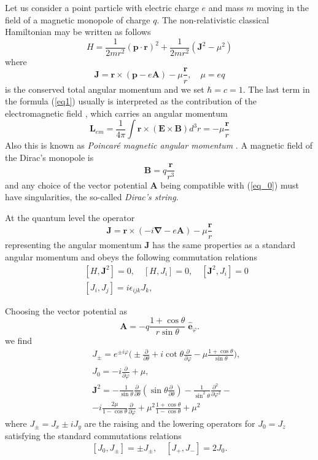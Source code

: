 \documentclass[a4paper,twocolumn,aps,showpacs,showkeys]{revtex4}
\begin{document}
Let us consider a point particle with electric charge $e$
and mass $m$ moving in the field of a magnetic monopole of charge $q$.
The non-relativistic classical Hamiltonian  may be written as follows
\cite{Gol}
\[
H = \frac{1}{2m r^2}({\mathbf p}\cdot{\mathbf r})^2 +
\frac{1}{2mr^2}({\mathbf J}^2 - \mu^2)
\]
where
\begin{equation}
{\mathbf J} = {\mathbf r}\times({\mathbf p} - e{\mathbf A}) -
\mu\frac{\mathbf r}{r}, \quad \mu = eq
\label{eq1}
\end{equation}
is the conserved total angular momentum and we set $\hbar = c =1$.
The last term in the formula (\ref{eq1}) usually is interpreted as the
contribution of the electromagnetic field \cite{Gol,Wil,Gol2,Lyn}, which
carries an angular momentum
\[
{\mathbf L}_{em}=\frac{1}{4\pi}\int {\mathbf r} \times({\mathbf
E}\times{\mathbf B}) d^3 r = - \mu\frac{\mathbf r}{r}
\]
Also this is known as {\it Poincar\'e magnetic angular momentum}
\cite{Ber}. A magnetic field of the Dirac's monopole is
\begin{equation}
{\mathbf B} = q \frac{\mathbf r}{r^3}
\label{eq_0}
\end{equation}
and any choice of the vector potential $\mathbf A$ being compatible with
(\ref{eq_0}) must have singularities, the so-called {\it Dirac's string}.

At the quantum level the operator
\begin{equation}
{\mathbf J} = {\mathbf r} \times \left({-i\mathbf \nabla} - e{\mathbf
A}\right) - \mu\frac{\mathbf r}{r}
\end{equation}
representing the angular momentum $\mathbf J$ has the same
properties as a standard angular momentum and obeys the following
commutation relations
\begin{eqnarray}
&&[H, {\mathbf J}^2] = 0, \quad [H, J_i] = 0,\quad  [{\mathbf J}^2, J_i] =
0 \label{eq5a} \\
&&[J_i, J_j] = i\epsilon_{ijk}J_k,
\end{eqnarray}

Choosing the vector potential as
\[
{\mathbf A} = -q\frac{1 + \cos\theta}{r\sin\theta}\;{\hat{\mathbf
e}}_{\varphi}.
\]
we find
\begin{eqnarray}
&&J_{\pm}= e^{\pm i\varphi}\bigg(\pm\frac{\partial}{\partial\theta}
+i\cot\theta \frac{\partial}{\partial\varphi} -
\mu\frac{1+\cos\theta}{\sin\theta} \bigg),\\
&&J_0=-i\frac{\partial}{\partial\varphi} + \mu,\\
&&{\mathbf J^2} =-\frac{1}{\sin{\theta}}
\frac{\partial~}{\partial\theta}\left(\sin{\theta}
\frac{\partial~}{\partial\theta}\right) -
\frac{1}{\sin^2{\theta}}\frac{\partial^2~}{\partial\varphi^2} - \nonumber\\
&&-i\frac{2\mu}{1 -\cos{\theta}}\frac{\partial~}{\partial\varphi}
+\mu^2\frac{1 + \cos{\theta}}{1 - \cos{\theta}} +\mu^2
\end{eqnarray}
where  $J_{\pm} = J_x \pm iJ_y$ are the raising and the lowering
operators for $J_0 = J_z$ satisfying the standard commutations
relations
\[
[J_0,J_{\pm}] = \pm J_{\pm}, \quad [J_{+},J_{-}] = 2J_{0}.
\]
\end{document}
